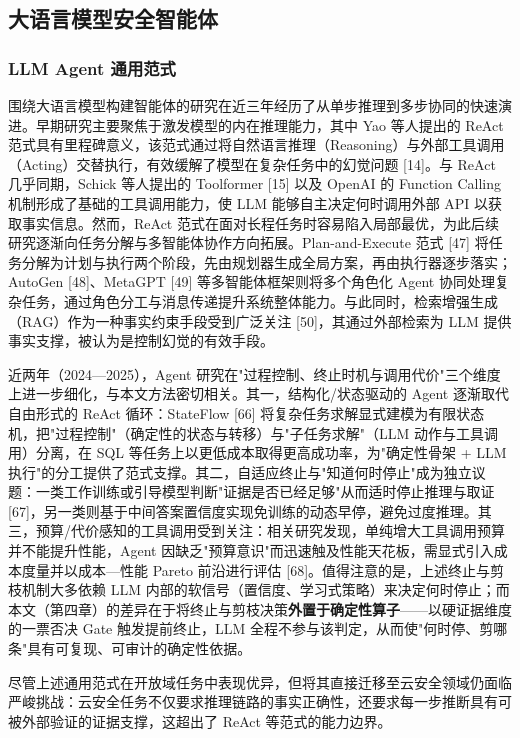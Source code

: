 \documentclass[a4paper,12pt]{ctexart}
\begin{document}
\subsection{大语言模型安全智能体}

\subsubsection{LLM Agent 通用范式}

围绕大语言模型构建智能体的研究在近三年经历了从单步推理到多步协同的快速演进。早期研究主要聚焦于激发模型的内在推理能力，其中 Yao 等人提出的 ReAct 范式具有里程碑意义，该范式通过将自然语言推理（Reasoning）与外部工具调用（Acting）交替执行，有效缓解了模型在复杂任务中的幻觉问题 [14]。与 ReAct 几乎同期，Schick 等人提出的 Toolformer [15] 以及 OpenAI 的 Function Calling 机制形成了基础的工具调用能力，使 LLM 能够自主决定何时调用外部 API 以获取事实信息。然而，ReAct 范式在面对长程任务时容易陷入局部最优，为此后续研究逐渐向任务分解与多智能体协作方向拓展。Plan-and-Execute 范式 [47] 将任务分解为计划与执行两个阶段，先由规划器生成全局方案，再由执行器逐步落实；AutoGen [48]、MetaGPT [49] 等多智能体框架则将多个角色化 Agent 协同处理复杂任务，通过角色分工与消息传递提升系统整体能力。与此同时，检索增强生成（RAG）作为一种事实约束手段受到广泛关注 [50]，其通过外部检索为 LLM 提供事实支撑，被认为是控制幻觉的有效手段。

近两年（2024—2025），Agent 研究在"过程控制、终止时机与调用代价"三个维度上进一步细化，与本文方法密切相关。其一，结构化/状态驱动的 Agent 逐渐取代自由形式的 ReAct 循环：StateFlow [66] 将复杂任务求解显式建模为有限状态机，把"过程控制"（确定性的状态与转移）与"子任务求解"（LLM 动作与工具调用）分离，在 SQL 等任务上以更低成本取得更高成功率，为"确定性骨架 + LLM 执行"的分工提供了范式支撑。其二，自适应终止与"知道何时停止"成为独立议题：一类工作训练或引导模型判断"证据是否已经足够"从而适时停止推理与取证 [67]，另一类则基于中间答案置信度实现免训练的动态早停，避免过度推理。其三，预算/代价感知的工具调用受到关注：相关研究发现，单纯增大工具调用预算并不能提升性能，Agent 因缺乏"预算意识"而迅速触及性能天花板，需显式引入成本度量并以成本—性能 Pareto 前沿进行评估 [68]。值得注意的是，上述终止与剪枝机制大多依赖 LLM 内部的软信号（置信度、学习式策略）来决定何时停止；而本文（第四章）的差异在于将终止与剪枝决策\textbf{外置于确定性算子}——以硬证据维度的一票否决 Gate 触发提前终止，LLM 全程不参与该判定，从而使"何时停、剪哪条"具有可复现、可审计的确定性依据。

尽管上述通用范式在开放域任务中表现优异，但将其直接迁移至云安全领域仍面临严峻挑战：云安全任务不仅要求推理链路的事实正确性，还要求每一步推断具有可被外部验证的证据支撑，这超出了 ReAct 等范式的能力边界。
\end{document}

